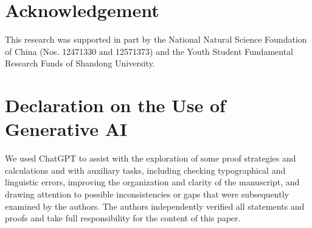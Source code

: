 \section*{Acknowledgement}
This research was supported in part by the National Natural Science Foundation
of China (Nos. 12471330 and 12571373) and the Youth Student Fundamental Research
Funds of Shandong University.

\section*{Declaration on the Use of Generative AI}
We used ChatGPT to assist with the exploration of some proof strategies
and calculations and with auxiliary tasks, including checking typographical
and linguistic errors, improving the organization and clarity of the manuscript,
and drawing attention to possible inconsistencies or gaps that were subsequently
examined by the authors. The authors independently verified all statements and
proofs and take full responsibility for the content of this paper.
